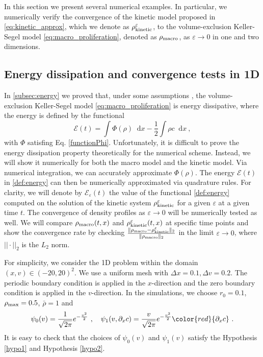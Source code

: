 \documentclass[review,onefignum,onetabnum]{siamart220329}
\newcommand {\e}  {\varepsilon}
\newcommand {\p}   {\partial}
\newcommand*\diff{\mathop{}\!\mathrm{d}}
\newcommand{\XR} {\color{red}}
\begin{document}
In this section we present several numerical examples.
In particular, we {numerically verify} the convergence of the kinetic model proposed in \cref{eq:kinetic_approx}, which we denote as $\rho_\textnormal{kinetic}^\e$, to the volume-exclusion Keller-Segel model \cref{eq:macro_proliferation}, denoted as $\rho_\textnormal{macro}$, as $\varepsilon\to 0$ in one and two dimensions. 
\subsection{Energy dissipation and convergence tests in 1D}
In \cref{subsec:energy} we proved that, under some assumptions \cite{calvez2006volume,carrillo2001entropy,de2018energy}, the volume-exclusion Keller-Segel model \cref{eq:macro_proliferation} is energy dissipative, 
{where the energy is defined by the functional
\begin{equation}\label{def:energy}
    \mathcal{E}(t)=\int\Phi(\rho)\diff x-\frac{1}{2}\int\rho c\diff x\ ,    
\end{equation}
\noindent with $ \Phi $ satisfing Eq. \cref{functionPhi}. 
{\XR Unfortunately, it is difficult to prove the energy dissipation property theoretically for the numerical scheme. 
Instead, we will show it numerically for both the macro model and the kinetic model. 
}
{Via numerical integration, we can accurately approximate $\Phi(\rho)$. The energy $\mathcal{E}(t)$ in \cref{def:energy} can then be numerically approximated via quadrature rules.} 
For clarity, we will denote by $\mathcal{E}_\e(t)$ the value of the functional \cref{def:energy} computed on the solution of the kinetic system $\rho_\textnormal{kinetic}^\e$ for a given $\e$ at a given time $t$. } 
The convergence of density profiles as $\varepsilon\to0$ will be numerically tested as well. 
We will compare $\rho_\textnormal{macro}(t,x)$ and $\rho_\textnormal{kinetic}^{\varepsilon}(t,x)$ at specific time points and show the convergence rate by checking $\frac{\|\rho_\textnormal{macro}-\rho_\textnormal{kinetic}^{\varepsilon}\|_2}{\| \rho_\textnormal{macro}\|_2}$ in the limit $\varepsilon\to0$, where $||\cdot||_2$ is the $L_2$ norm.

For simplicity, we consider the 1D problem  within the domain $(x, v) \in (-20,20)^2$. 
We use a uniform mesh with {$\Delta x = 0.1, \Delta v = 0.2$}. 
The periodic boundary condition is applied in the $x$-direction and the zero boundary condition is applied in the $v$-direction. 
In the simulations, we choose  $r_0=0.1$, $\rho_{\rm max} = 0.5$, $\bar{\rho} = 1$ and 
\begin{equation}\label{def:psi01}
    \psi_0(v) = \frac{1}{\sqrt{2\pi}}e^{-\frac{v^2}{2}}\ , \quad \psi_1(v, {{\p_x c}}) = \frac{v}{\sqrt{2\pi}}e^{-\frac{v^2}{2}} {\color{red}{\p_x c}}\ .
\end{equation}
{It is easy to check that the choices of $\psi_0(v)$ and $\psi_1(v)$ satisfy the Hypothesis \cref{hypo1} and Hypothesis  \cref{hypo2}.}
\end{document}
